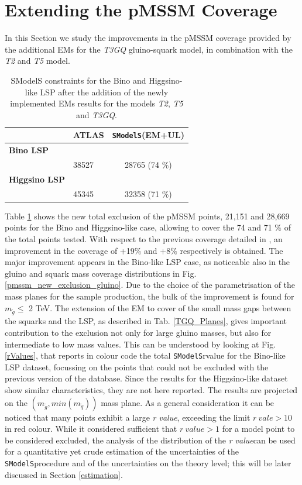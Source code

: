\documentclass[preprint,number,sort&compress,twocolumn,3p]{elsstyarticle}
\newcommand{\SMO}{\texttt{SModelS\xspace}}
\newcommand{\RVALUE}{\textit{r value}}
\begin{document}
\section{Extending the pMSSM Coverage}\label{sec::impact}
In this Section we study the improvements in the pMSSM coverage provided by the additional EMs for the \textit{T3GQ} gluino-squark model, in combination with the \textit{T2} and \textit{T5} model. 
\\
%
\begin{table}[!h]
	\footnotesize
	\begin{center}
		\renewcommand{\arraystretch}{1.3}
		\begin{tabular}{l l c }  \toprule  \toprule 
			& \textbf{ATLAS} & \textbf{\SMO (EM+UL)} \\ \toprule \toprule 
			\textbf{Bino LSP} & &  \\
			& 38527 & 28765 (74 $\% $) \\ 
			\textbf{Higgsino LSP} & &   \\
			& 45345 & 32358 (71 $\% $) \\ \bottomrule   \bottomrule  
		\end{tabular}
	\end{center}
	\caption{SModelS constraints for the Bino and Higgsino-like LSP after the addition of the newly implemented EMs results for the models \textit{T2}, \textit{T5} and \textit{T3GQ}.}
	\label{Res_Tab_New}
\end{table}
%
Table \ref{Res_Tab_New} shows the new total exclusion of the pMSSM points, 21,151 and 28,669 points for the Bino and Higgsino-like case, allowing to cover the 74 and 71 $\%$ of the total points tested. With respect to the previous coverage detailed in \cite{Ambrogi:2017lov}, an improvement in the coverage of +19$\%$ and +8$\%$ respectively is obtained.
%
The major improvement appears in the Bino-like LSP case, as noticeable also in the gluino and squark mass coverage distributions in Fig. \ref{pmssm_new_exclusion_gluino}. Due to the choice of the parametrisation of the mass planes for the sample production, the bulk of the improvement is found for $m_{\tilde g}\leq$ 2 TeV. The extension of the EM to cover of the small mass gaps between the squarks and the LSP, as described in Tab. \ref{TGQ_Planes}, gives important contribution to the exclusion not only for large gluino masses, but also for intermediate to low mass values.
%
This can be understood by looking at Fig. \ref{rValues}, that reports in colour code the total \SMO rvalue for the Bino-like LSP dataset, focussing
on the points that could not be excluded with the previous version of the database. Since the results for the Higgsino-like dataset show similar characteristics, they are not here reported. The results are projected on the $(m_{\tilde{g}},min(m_{\tilde q}))$ mass plane. As a general consideration it can be noticed that many points exhibit a large \RVALUE, exceeding the limit $r \ vale > 10$ in red colour. While it considered sufficient that $r \ value >1$ for a model point to be considered excluded, the analysis of the distribution of the \RVALUE can be used for a quantitative yet crude estimation of the uncertainties of the \SMO procedure and of the uncertainties on the theory level; this will be later discussed in Section \ref{estimation}.
\end{document}
